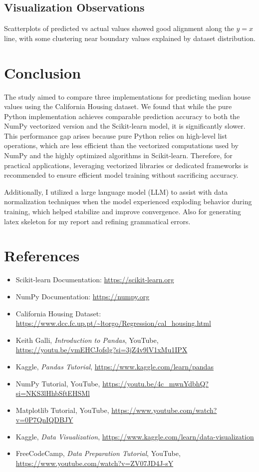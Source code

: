 \documentclass[a4paper,12pt]{article}
\begin{document}
\subsection{Visualization Observations}
Scatterplots of predicted vs actual values showed good alignment along the \(y = x\) line, with some clustering near boundary values explained by dataset distribution.

\section{Conclusion}
The study aimed to compare three implementations for predicting median house values using the California Housing dataset. We found that while the pure Python implementation achieves comparable prediction accuracy to both the NumPy vectorized version and the Scikit-learn model, it is significantly slower. This performance gap arises because pure Python relies on high-level list operations, which are less efficient than the vectorized computations used by NumPy and the highly optimized algorithms in Scikit-learn. Therefore, for practical applications, leveraging vectorized libraries or dedicated frameworks is recommended to ensure efficient model training without sacrificing accuracy.

Additionally, I utilized a large language model (LLM) to assist with data normalization techniques when the model experienced exploding behavior during training, which helped stabilize and improve convergence. Also for generating latex skeleton for my report and refining grammatical errors.

\section{References}
\begin{itemize}
    \item Scikit-learn Documentation: \url{https://scikit-learn.org}
    \item NumPy Documentation: \url{https://numpy.org}
    \item California Housing Dataset: \url{https://www.dcc.fc.up.pt/~ltorgo/Regression/cal_housing.html}
    \item Keith Galli, \textit{Introduction to Pandas}, YouTube, \url{https://youtu.be/vmEHCJofslg?si=3jZ4v9lV1xMu1IPX}
    \item Kaggle, \textit{Pandas Tutorial}, \url{https://www.kaggle.com/learn/pandas}
    \item NumPy Tutorial, YouTube, \url{https://youtu.be/4c_mwnYdbhQ?si=NKS3lHhbSftEHSMl}
    \item Matplotlib Tutorial, YouTube, \url{https://www.youtube.com/watch?v=0P7QnIQDBJY}
    \item Kaggle, \textit{Data Visualization}, \url{https://www.kaggle.com/learn/data-visualization}
    \item FreeCodeCamp, \textit{Data Preparation Tutorial}, YouTube, \url{https://www.youtube.com/watch?v=ZV07JD4J-sY}
\end{itemize}
\end{document}
